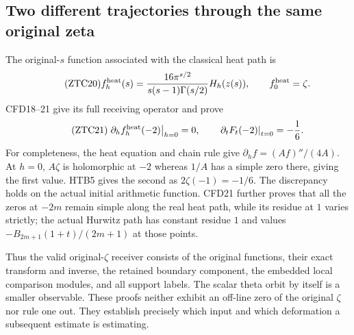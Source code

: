 \subsection{Two different trajectories through the same original zeta}

The original-$s$ function associated with the classical heat path is
\begin{equation}\tag{ZTC20}
 f_h^{\rm heat}(s)=\frac{16\pi^{s/2}}
                         {s(s-1)\Gamma(s/2)}H_h(z(s)),
 \qquad f_0^{\rm heat}=\zeta.
\end{equation}
CFD18--21 give its full receiving operator and prove
\begin{equation}\tag{ZTC21}
 \left.\partial_hf_h^{\rm heat}(-2)\right|_{h=0}=0,
 \qquad
 \left.\partial_tF_t(-2)\right|_{t=0}=-\frac16.
\end{equation}
For completeness, the heat equation and chain rule give
$\partial_hf=(Af)''/(4A)$. At $h=0$, $A\zeta$ is holomorphic
at $-2$ whereas $1/A$ has a simple zero there, giving the first
value. HTB5 gives the second as $2\zeta(-1)=-1/6$.
The discrepancy holds on the actual initial arithmetic function.
CFD21 further proves that all the zeros at $-2m$ remain simple
along the real heat path, while its residue at $1$ varies strictly;
the actual Hurwitz path has constant residue $1$ and values
$-B_{2m+1}(1+t)/(2m+1)$ at those points.

Thus the valid original-$\zeta$ receiver consists of the original
functions, their exact transform and inverse, the retained boundary
component, the embedded local comparison modules, and all support
labels. The scalar theta orbit by itself is a smaller observable.
These proofs neither exhibit an off-line zero of the original
$\zeta$ nor rule one out. They establish precisely which input and
which deformation a subsequent estimate is estimating.
